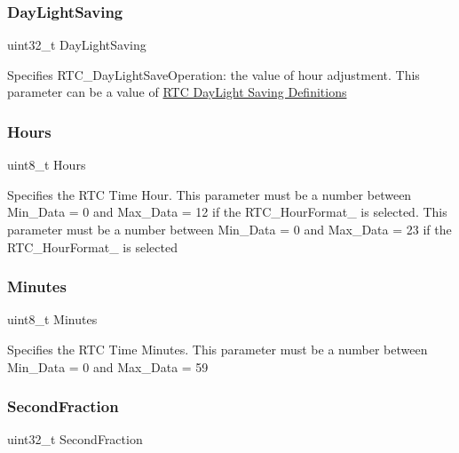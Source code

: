 \subsubsection{\texorpdfstring{Day\+Light\+Saving}{DayLightSaving}}
{\footnotesize\ttfamily uint32\+\_\+t Day\+Light\+Saving}

Specifies R\+T\+C\+\_\+\+Day\+Light\+Save\+Operation\+: the value of hour adjustment. This parameter can be a value of \hyperlink{group___r_t_c___day_light_saving___definitions}{R\+TC Day\+Light Saving Definitions} \mbox{\label{struct_r_t_c___time_type_def_a836edba653a6aa73789d68e7bd2ee757}} 
\subsubsection{\texorpdfstring{Hours}{Hours}}
{\footnotesize\ttfamily uint8\+\_\+t Hours}

Specifies the R\+TC Time Hour. This parameter must be a number between Min\+\_\+\+Data = 0 and Max\+\_\+\+Data = 12 if the R\+T\+C\+\_\+\+Hour\+Format\+\_ is selected. This parameter must be a number between Min\+\_\+\+Data = 0 and Max\+\_\+\+Data = 23 if the R\+T\+C\+\_\+\+Hour\+Format\+\_ is selected \mbox{\label{struct_r_t_c___time_type_def_a37e1bd6f0ab1dcc18f95f8d0193cd26e}} 
\subsubsection{\texorpdfstring{Minutes}{Minutes}}
{\footnotesize\ttfamily uint8\+\_\+t Minutes}

Specifies the R\+TC Time Minutes. This parameter must be a number between Min\+\_\+\+Data = 0 and Max\+\_\+\+Data = 59 \mbox{\label{struct_r_t_c___time_type_def_a0a6d7b93d51459e83607fd65d86aa497}} 
\subsubsection{\texorpdfstring{Second\+Fraction}{SecondFraction}}
{\footnotesize\ttfamily uint32\+\_\+t Second\+Fraction}

